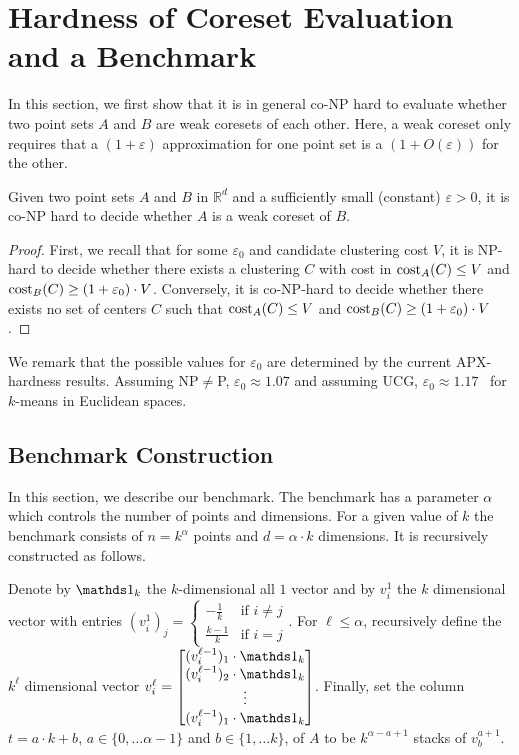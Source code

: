 \section{Hardness of Coreset Evaluation and a Benchmark}
\label{sec:coreset-evaluation-hard}
\label{sec:benchmark}

In this section, we first show that it is in general co-NP hard to evaluate whether two point sets $A$ and $B$ are weak coresets of each other. Here, a weak coreset only requires that a $(1+\varepsilon)$ approximation for one point set is a $(1+O(\varepsilon))$ for the other.


\begin{proposition}
\label{prop:hardness}
Given two point sets $A$ and $B$ in $\mathbb{R}^d$ and a sufficiently small (constant) $\varepsilon>0$, it is co-NP hard to decide whether $A$ is a weak coreset of $B$.
\end{proposition}
\begin{proof}
First, we recall that for some $\varepsilon_0$ and candidate clustering cost $V$, it is NP-hard to decide whether there exists a clustering $C$ with cost in $\text{cost}_A(C)\leq V$ and $\text{cost}_B(C)\geq (1+\varepsilon_0)\cdot V$.
Conversely, it is co-NP-hard to decide whether there exists no set of centers $C$ such that $\text{cost}_A(C)\leq V$ and $\text{cost}_B(C) \geq (1+\varepsilon_0)\cdot V$.
\end{proof}

We remark that the possible values for $\varepsilon_0$ are determined by the current APX-hardness results. Assuming NP$\neq$P, $\varepsilon_0\approx 1.07$ and assuming UCG, $\varepsilon_0 \approx 1.17$~\cite{Cohen-AddadSL21,Cohen-AddadS19} for $k$-means in Euclidean spaces.

\subsection{Benchmark Construction}

In this section, we describe our benchmark. The benchmark has a parameter $\alpha$ which controls the number of points and dimensions.
For a given value of $k$ the benchmark consists of $n=k^\alpha$ points and $d=\alpha \cdot k$ dimensions.
It is recursively constructed as follows.

Denote by $\one_k$ 
the $k$-dimensional all $1$ vector and by $v_i^1$ the $k$ dimensional vector with entries $(v_i^1)_j = \begin{cases}-\frac{1}{k} & \text{if } i\neq j\\
\frac{k-1}{k} & \text{if } i= j\end{cases}$.
For $\ell\leq \alpha$, recursively define the $k^{\ell}$ dimensional vector $v_i^{\ell} = \begin{bmatrix}
(v_i^{\ell-1})_1 \cdot \one_k \\
(v_i^{\ell-1})_2 \cdot \one_k \\
\vdots \\
(v_i^{\ell-1})_1 \cdot \one_k
\end{bmatrix}$. Finally, set the column $t = a\cdot k + b$, $a\in \{0,\ldots \alpha-1\}$ and $b \in \{1,\ldots k\}$, of $A$ to be $k^{\alpha-a+1}$  stacks of $v_b^{a+1}$.


